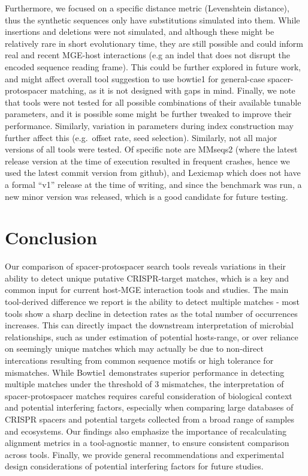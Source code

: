 \documentclass[
]{article}
\begin{document}
Furthermore, we focused on a specific distance metric (Levenshtein
distance), thus the synthetic sequences only have substitutions
simulated into them. While insertions and deletions were not simulated,
and although these might be relatively rare in short evolutionary time,
they are still possible and could inform real and recent MGE-host
interactions (e.g an indel that does not disrupt the encoded sequence
reading frame). This could be further explored in future work, and might
affect overall tool suggestion to use bowtie1 for general-case
spacer-protospacer matching, as it is not designed with gaps in mind.
Finally, we note that tools were not tested for all possible
combinations of their available tunable parameters, and it is possible
some might be further tweaked to improve their performance. Similarly,
variation in parameters during index construction may further affect
this (e.g.~offset rate, seed selection). Similarly, not all major
versions of all tools were tested. Of specific note are MMseqs2 (where
the latest release version at the time of execution resulted in frequent
crashes, hence we used the latest commit version from github), and
Lexicmap which does not have a formal ``v1'' release at the time of
writing, and since the benchmark was run, a new minor version was
released, which is a good candidate for future testing.

\section{Conclusion}\label{conclusion}

Our comparison of spacer-protospacer search tools reveals variations in
their ability to detect unique putative CRISPR-target matches, which is
a key and common input for current host-MGE interaction tools and
studies. The main tool-derived difference we report is the ability to
detect multiple matches - most tools show a sharp decline in detection
rates as the total number of occurrences increases. This can directly
impact the downstream interpretation of microbial relationships, such as
under estimation of potential hosts-range, or over reliance on seemingly
unique matches which may actually be due to non-direct intercations
resulting from common sequence motifs or high tolerance for mismatches.
While Bowtie1 demonstrates superior performance in detecting multiple
matches under the threshold of 3 mismatches, the interpretation of
spacer-protospacer matches requires careful consideration of biological
context and potential interfering factors, especially when comparing
large databases of CRISPR spacers and potential targets collected from a
broad range of samples and ecosystems. Our findings also emphasize the
importance of recalculating alignment metrics in a tool-agnostic manner,
to ensure consistent comparison across tools. Finally, we provide
general recommendations and experimental design considerations of
potential interfering factors for future studies.
\end{document}
